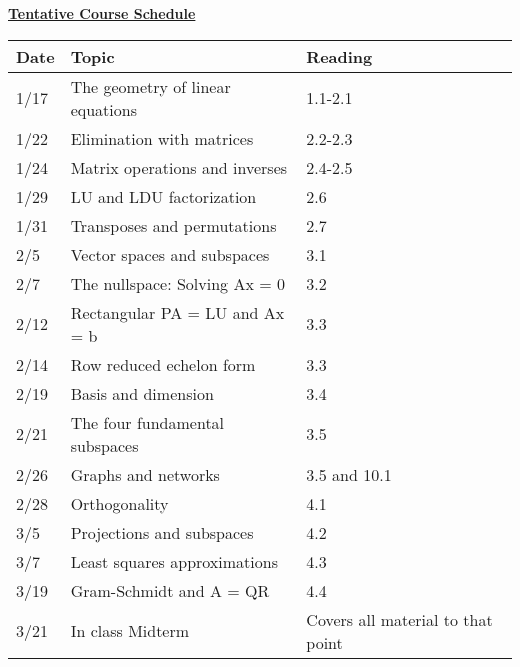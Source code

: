 \documentclass[11pt, a4paper]{article}
\begin{document}
\centerline{\Large \underline{\textbf{Tentative Course Schedule}}}
\vspace{5pt}
\small
\begin{tabular}{ |p{0.5in}|p{4.0in}|p{1.0in}| }
\hline
   \textbf{Date} & \textbf{Topic} & \textbf{Reading}  \\ \hline
 1/17 & The geometry of linear equations  &  1.1-2.1 \\ \hline
1/22 & Elimination with matrices &  2.2-2.3 \\ \hline
1/24 & Matrix operations and inverses &  2.4-2.5﻿ \\ \hline
1/29 & LU and LDU factorization &  2.6﻿ \\ \hline
1/31 & Transposes and permutations &  2.7﻿ \\ \hline
2/5 & Vector spaces and subspaces &  3.1﻿ \\ \hline
2/7 & The nullspace: Solving Ax = 0 &  3.2﻿ \\ \hline
2/12 & Rectangular PA = LU and Ax = b &  3.3 \\ \hline
2/14 & Row reduced echelon form &  3.3 \\ \hline
2/19 & Basis and dimension &  3.4 \\ \hline
2/21 & The four fundamental subspaces &  3.5 \\ \hline
2/26 & Graphs and networks &  3.5 and 10.1 \\ \hline
2/28 & Orthogonality &  4.1 \\ \hline
3/5 & Projections and subspaces &  4.2 \\ \hline
3/7 & Least squares approximations &  4.3 \\ \hline
3/19 & Gram-Schmidt and A = QR &  4.4 \\ \hline
3/21 & In class Midterm &   Covers all material to that point \\ \hline
\end{tabular}

\newpage
\end{document}
